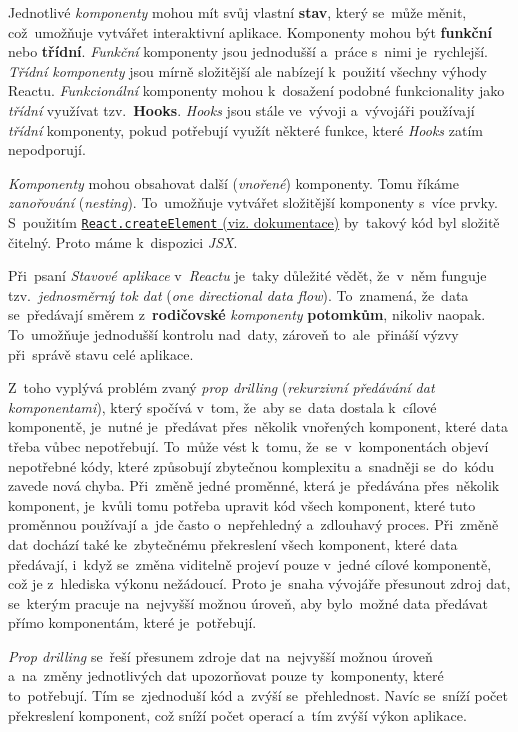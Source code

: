 \documentclass[11pt,a4paper]{report}
\begin{document}
            Jednotlivé \emph{komponenty} mohou mít svůj vlastní \textbf{stav}, který se~může měnit, což~umožňuje vytvářet interaktivní aplikace. Komponenty mohou být \textbf{funkční} nebo \textbf{třídní}. \emph{Funkční} komponenty jsou jednodušší a~práce s~nimi je~rychlejší. \emph{Třídní komponenty} jsou mírně složitější ale nabízejí k~použití všechny výhody Reactu. \emph{Funkcionální} komponenty mohou k~dosažení podobné funkcionality jako \emph{třídní} využívat tzv.~\textbf{Hooks}. \emph{Hooks} jsou stále ve~vývoji a~vývojáři používají \emph{třídní} komponenty, pokud potřebují využít některé funkce, které \emph{Hooks} zatím nepodporují.

            \emph{Komponenty} mohou obsahovat další (\emph{vnořené}) komponenty. Tomu říkáme \emph{zanořování} (\emph{nesting}). To~umožňuje vytvářet složitější komponenty s~více prvky. S~použitím \href{https://react.dev/reference/react/createElement}{\texttt{React.createElement} (viz. dokumentace)} by~takový kód byl složitě čitelný. Proto máme k~dispozici \emph{JSX}.

            Při~psaní \emph{Stavové aplikace} v~\emph{Reactu} je~taky důležité vědět, že~v~něm funguje tzv.~\emph{jednosměrný tok dat} (\emph{one directional data flow}). To~znamená, že~data se~předávají směrem z~\textbf{rodičovské} \emph{komponenty} \textbf{potomkům}, nikoliv naopak. To~umožňuje jednodušší kontrolu nad~daty, zároveň to~ale~přináší výzvy při~správě stavu celé aplikace.
            
            Z~toho vyplývá problém zvaný \emph{prop drilling} (\emph{rekurzivní předávání dat komponentami}), který spočívá v~tom, že~aby se~data dostala k~cílové komponentě, je~nutné je~předávat přes~několik vnořených komponent, které data třeba vůbec nepotřebují. To~může vést k~tomu, že~se~v~komponentách objeví nepotřebné kódy, které způsobují zbytečnou komplexitu a~snadněji se~do~kódu zavede nová chyba. Při~změně jedné proměnné, která je~předávána přes~několik komponent, je~kvůli tomu potřeba upravit kód všech komponent, které tuto proměnnou používají a~jde často o~nepřehledný a~zdlouhavý proces. Při~změně dat dochází také ke~zbytečnému překreslení všech komponent, které data předávají, i~když se~změna viditelně projeví pouze v~jedné cílové komponentě, což je z~hlediska výkonu nežádoucí. Proto je~snaha vývojáře přesunout zdroj dat, se~kterým pracuje na~nejvyšší možnou úroveň, aby bylo~možné data předávat přímo komponentám, které je~potřebují.

            \emph{Prop drilling} se~řeší přesunem zdroje dat na~nejvyšší možnou úroveň a~na~změny jednotlivých dat upozorňovat pouze ty~komponenty, které to~potřebují. Tím se~zjednoduší kód a~zvýší se~přehlednost. Navíc se~sníží počet překreslení komponent, což sníží počet operací a~tím zvýší výkon aplikace.
            
\end{document}
